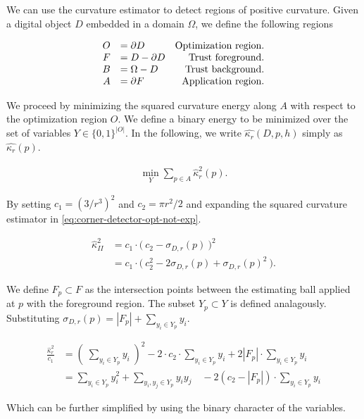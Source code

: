 \documentclass[runningheads]{llncs}
\begin{document}
We can use the curvature estimator to detect regions of positive curvature. Given a digital object $D$ embedded in a domain $\Omega$, we define the following regions

\[\arraycolsep=5pt
\begin{array}{rlr}
	O &= \partial D & \text{Optimization region.} \\
	F &= D - \partial D & \text{Trust foreground.} \\
	B &= \Omega - D & \text{Trust background.} \\
	A &= \partial F & \text{Application region}.
\end{array}
\]

We proceed by minimizing the squared curvature energy along $A$ with respect to the optimization region $O$. We define a binary energy to be minimized over the set of variables $Y \in \{0,1\}^{|O|}$. In the following, we write $\hat{\kappa_r}(D,p,h)$ simply as $\hat{\kappa_r}(p)$.

\begin{align}			
	\min_{Y} \sum_{p \in A}{\hat{\kappa}_{r}^2(p)}.
	\label{eq:corner-detector-opt-not-exp}
\end{align}

By setting $c_1 = (3/r^3)^2$ and $c_2=\pi r^2/2$ and expanding the squared curvature estimator in \eqref{eq:corner-detector-opt-not-exp}.

\begin{align*}
\hat{\kappa}_{II}^2 &= c_1 \cdot \big(\: c_2 - \sigma_{D,r}(p) \: \big)^2 \\
&= c_1 \cdot \big(\: c_2^2 - 2\sigma_{D,r}(p) + \sigma_{D,r}(p)^2 \: \big).
\end{align*}

We define $F_p \subset F$ as the intersection points between the estimating ball applied at $p$ with the foreground region. The subset $Y_p \subset Y$ is defined  analagously. Substituting $\sigma_{D,r}(p) = |F_{p}| + \sum_{y_i \in Y_p}{y_i}$.

	\begin{align*}
		\frac{\hat{\kappa}_{r}^2}{c_1} &= \left( \; \sum_{y_i \in Y_{p}}{y_i} \; \right) ^2 -2 \cdot c_2\cdot \sum_{y_i \in Y_{p}}{y_i} + 2 |F_p| \cdot \sum_{ y_i \in Y_{p} }{y_i} \\[1em]
		&= \sum_{y_i \in Y_{p}}{y_i^2} + \sum_{ y_i,y_j \in Y_{p} }{y_iy_j} \quad - 2 (c_2-|F_p|)\cdot \sum_{y_i \in Y_{p}}{y_i}
	\end{align*}
	
	Which can be further simplified by using the binary character of the variables.
	
\end{document}
